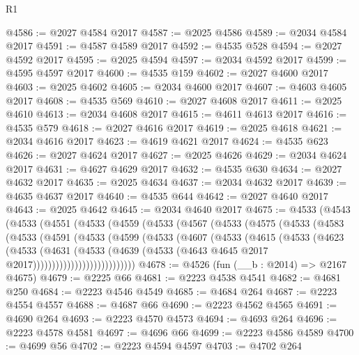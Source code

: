 \begin{lexlean}{R1}
\begin{coremodule}
@4586 := @2027 @4584 @2017
@4587 := @2025 @4586
@4589 := @2034 @4584 @2017
@4591 := @4587 @4589 @2017
@4592 := @4535 @528
@4594 := @2027 @4592 @2017
@4595 := @2025 @4594
@4597 := @2034 @4592 @2017
@4599 := @4595 @4597 @2017
@4600 := @4535 @159
@4602 := @2027 @4600 @2017
@4603 := @2025 @4602
@4605 := @2034 @4600 @2017
@4607 := @4603 @4605 @2017
@4608 := @4535 @569
@4610 := @2027 @4608 @2017
@4611 := @2025 @4610
@4613 := @2034 @4608 @2017
@4615 := @4611 @4613 @2017
@4616 := @4535 @579
@4618 := @2027 @4616 @2017
@4619 := @2025 @4618
@4621 := @2034 @4616 @2017
@4623 := @4619 @4621 @2017
@4624 := @4535 @623
@4626 := @2027 @4624 @2017
@4627 := @2025 @4626
@4629 := @2034 @4624 @2017
@4631 := @4627 @4629 @2017
@4632 := @4535 @630
@4634 := @2027 @4632 @2017
@4635 := @2025 @4634
@4637 := @2034 @4632 @2017
@4639 := @4635 @4637 @2017
@4640 := @4535 @644
@4642 := @2027 @4640 @2017
@4643 := @2025 @4642
@4645 := @2034 @4640 @2017
@4675 := @4533
    (@4543
      (@4533
        (@4551
          (@4533
            (@4559
              (@4533
                (@4567
                  (@4533
                    (@4575
                      (@4533
                        (@4583
                          (@4533
                            (@4591
                              (@4533
                                (@4599
                                  (@4533
                                    (@4607
                                      (@4533
                                        (@4615
                                          (@4533
                                            (@4623
                                              (@4533
                                                (@4631
                                                  (@4533
                                                    (@4639
                                                      (@4533
                                                        (@4643
                                                          @4645
                                                          @2017
                                                          @2017)))))))))))))))))))))))))))
@4678 := @4526 (fun (__b : @2014) => @2167 @4675)
@4679 := @2225 @66
@4681 := @2223 @4538 @4541
@4682 := @4681 @250
@4684 := @2223 @4546 @4549
@4685 := @4684 @264
@4687 := @2223 @4554 @4557
@4688 := @4687 @66
@4690 := @2223 @4562 @4565
@4691 := @4690 @264
@4693 := @2223 @4570 @4573
@4694 := @4693 @264
@4696 := @2223 @4578 @4581
@4697 := @4696 @66
@4699 := @2223 @4586 @4589
@4700 := @4699 @56
@4702 := @2223 @4594 @4597
@4703 := @4702 @264

\end{coremodule}
\end{lexlean}
